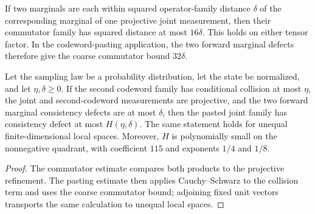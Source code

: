 \begin{theorem}
\label{thm:qld-pasting-explicit}
\leanok
{}
If two marginals are each within squared operator-family distance $\delta$ of
the corresponding marginal of one projective joint measurement, then their
commutator family has squared distance at most $16\delta$.  This holds on
either tensor factor.  In the codeword-pasting application, the two forward
marginal defects therefore give the coarse commutator bound $32\delta$.

Let the sampling law be a probability distribution, let the state be
normalized, and let $\eta,\delta\geq0$.  If the second codeword family has
conditional collision at most $\eta$, the joint and second-codeword
measurements are projective, and the two forward marginal consistency defects
are at most $\delta$, then the pasted joint family has consistency defect at
most $H(\eta,\delta)$.  The same statement holds for unequal
finite-dimensional local spaces.  Moreover, $H$ is polynomially small on the
nonnegative quadrant, with coefficient $115$ and exponents $1/4$ and $1/8$.
\end{theorem}
\begin{proof}
\leanok
The commutator estimate compares both products to the projective refinement.
The pasting estimate then applies Cauchy--Schwarz to the collision term and
uses the coarse commutator bound; adjoining fixed unit vectors transports the
same calculation to unequal local spaces.
\end{proof}

